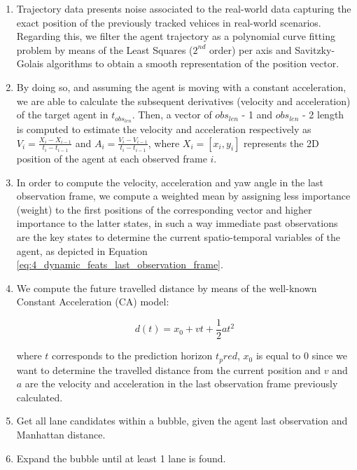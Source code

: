 \begin{enumerate}
	\item Trajectory data presents noise associated to the real-world data capturing the exact position of the previously tracked vehices in real-world scenarios. Regarding this, we filter the agent trajectory as a polynomial curve fitting problem by means of the Least Squares ($2^{nd}$ order) per axis and Savitzky-Golais \cite{savitzky1964smoothing} algorithms to obtain a smooth representation of the position vector.
	
	\item By doing so, and assuming the agent is moving with a constant acceleration, we are able to calculate the subsequent derivatives (velocity and acceleration) of the target agent in $t_{obs_{len}}$. Then, a vector of $obs_{len}$ - 1 and $obs_{len}$ - 2 length is computed to estimate the velocity and acceleration respectively as $V_{i}=\frac{X_{i}-X_{i-1}}{t_{i}-t_{i-1}}$ and $A_{i}=\frac{V_{i}-V_{i-1}}{t_{i}-t_{i-1}}$, where $X_{i}={[x_{i},y_{i}]}$ represents the 2D position of the agent at each observed frame $i$.
	
	\item In order to compute the velocity, acceleration and yaw angle in the last observation frame, we compute a weighted mean by assigning less importance (weight) to the first positions of the corresponding vector and higher importance to the latter states, in such a way immediate past observations are the key states to determine the current spatio-temporal variables of the agent, as depicted in Equation \ref{eq:4_dynamic_feats_last_observation_frame}.
	
	\item We compute the future travelled distance by means of the well-known Constant Acceleration (CA) model:
	
	\begin{equation}
		d(t) = x_0 + vt + \frac{1}{2}at^2
	\end{equation}

	where $t$ corresponds to the prediction horizon $t_pred$, $x_0$ is equal to $0$ since we want to determine the travelled distance from the current position and $v$ and $a$ are the velocity and acceleration in the last observation frame previously calculated.
	
	\item Get all lane candidates within a bubble, given the agent last observation and Manhattan distance.
	
	\item Expand the bubble until at least 1 lane is found.
	

\end{enumerate}
